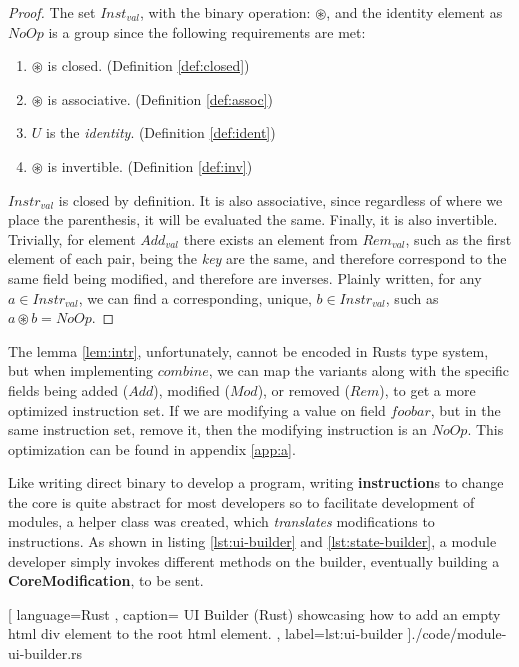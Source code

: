 \begin{proof}
  The set $Inst_{val}$, with the binary operation: $\circledast$, and the
  identity element as $NoOp$ is a group since
  the following requirements are met:
  \begin{enumerate}
    \item $\circledast$ is closed. (Definition \ref{def:closed})
    \item $\circledast$ is associative. (Definition \ref{def:assoc})
    \item $U$ is the \textit{identity}. (Definition \ref{def:ident})
    \item $\circledast$ is invertible. (Definition \ref{def:inv})
  \end{enumerate}
  $Instr_{val}$ is closed by definition. It is also associative, since
  regardless of where we place  the parenthesis, it will be evaluated the same.
  Finally, it is also invertible. Trivially, for element $Add_{val}$ there
  exists an element from $Rem_{val}$, such as the first element of each pair,
  being the \textit{key} are the same, and therefore correspond to the same
  field being modified, and therefore are inverses. Plainly written, for any
  $a \in Instr_{val}$, we can find a corresponding, unique, $b \in Instr_{val}$,
  such as $a \circledast b = NoOp$.
\end{proof}

The lemma \ref{lem:intr}, unfortunately, cannot be encoded in Rusts type
system, but when implementing $combine$, we can map the variants along with the
specific fields being added ($Add$), modified ($Mod$), or removed ($Rem$), to get
a more optimized instruction set. If we are modifying a value on field $foobar$,
but in the same instruction set, remove it, then the modifying instruction is an
$NoOp$. This optimization can be found in appendix \ref{app:a}.

Like writing direct binary to develop a program, writing \textbf{instruction}s to
change the core is quite abstract for most developers so to facilitate development
of modules, a helper class was created, which \textit{translates} modifications
to instructions. As shown in listing \ref{lst:ui-builder} and
\ref{lst:state-builder}, a module developer simply invokes different methods on
the builder, eventually building a \textbf{CoreModification}, to be sent.

\begin{center}
  
   [ language=Rust
   , caption={
     UI Builder (Rust) showcasing how to add an empty \gls{html} div element to
     the root \gls{html} element.
   }
   , label=lst:ui-builder
   ]{./code/module-ui-builder.rs}
\end{center}

